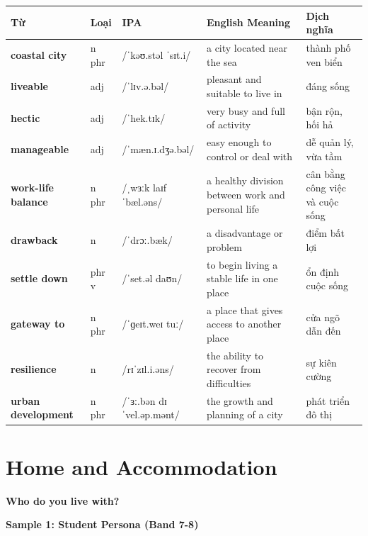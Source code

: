 \vspace{0.8em}
\begin{center}
\renewcommand{\arraystretch}{1.65}
\begin{tabularx}{\textwidth}{|V{0.22\textwidth}|C{0.07\textwidth}|I{0.20\textwidth}|Y|V{0.18\textwidth}|}
\hline
{}
\textbf{Từ} & \textbf{Loại} & \textbf{IPA} & \textbf{English Meaning} & \textbf{Dịch nghĩa} \\
\hline
\textbf{coastal city} & n phr & /ˈkəʊ.stəl ˈsɪt.i/ & a city located near the sea & thành phố ven biển \\ \hline
\textbf{liveable} & adj & /ˈlɪv.ə.bəl/ & pleasant and suitable to live in & đáng sống \\ \hline
\textbf{hectic} & adj & /ˈhek.tɪk/ & very busy and full of activity & bận rộn, hối hả \\ \hline
\textbf{manageable} & adj & /ˈmæn.ɪ.dʒə.bəl/ & easy enough to control or deal with & dễ quản lý, vừa tầm \\ \hline
\textbf{work-life balance} & n phr & /ˌwɜːk laɪf ˈbæl.əns/ & a healthy division between work and personal life & cân bằng công việc và cuộc sống \\ \hline
\textbf{drawback} & n & /ˈdrɔː.bæk/ & a disadvantage or problem & điểm bất lợi \\ \hline
\textbf{settle down} & phr v & /ˈset.əl daʊn/ & to begin living a stable life in one place & ổn định cuộc sống \\ \hline
\textbf{gateway to} & n phr & /ˈɡeɪt.weɪ tuː/ & a place that gives access to another place & cửa ngõ dẫn đến \\ \hline
\textbf{resilience} & n & /rɪˈzɪl.i.əns/ & the ability to recover from difficulties & sự kiên cường \\ \hline
\textbf{urban development} & n phr & /ˈɜː.bən dɪˈvel.əp.mənt/ & the growth and planning of a city & phát triển đô thị \\ \hline
\end{tabularx}
\end{center}

\newpage

\section{Home and Accommodation}
\begin{ieltsquestion}
\textbf{Who do you live with?}
\end{ieltsquestion}
\textbf{Sample 1: Student Persona (Band 7-8)}

